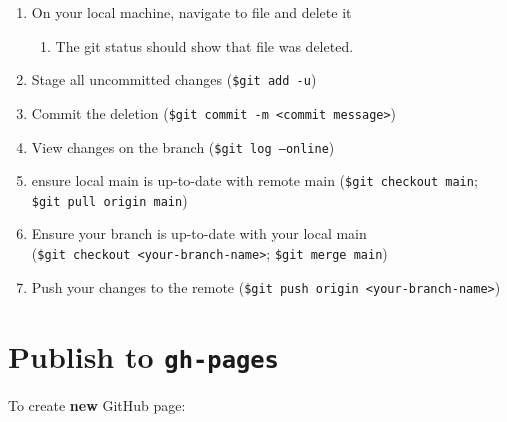 \documentclass[
  letterpaper,
  DIV=11,
  numbers=noendperiod]{scrreprt}
\providecommand{\tightlist}{%
  \setlength{\itemsep}{0pt}\setlength{\parskip}{0pt}}\usepackage{longtable,booktabs,array}
\begin{document}
\begin{enumerate}
\def\labelenumi{\arabic{enumi}.}
\tightlist
\item
  On your local machine, navigate to file and delete it

  \begin{enumerate}
  \def\labelenumii{\alph{enumii}.}
  \tightlist
  \item
    The git status should show that file was deleted.\\
  \end{enumerate}
\item
  Stage all uncommitted changes (\texttt{\$git\ add\ -u})\\
\item
  Commit the deletion
  (\texttt{\$git\ commit\ -m\ \textless{}commit\ message\textgreater{}})\\
\item
  View changes on the branch (\texttt{\$git\ log\ –online})\\
\item
  ensure local main is up-to-date with remote main
  (\texttt{\$git\ checkout\ main}; \texttt{\$git\ pull\ origin\ main})\\
\item
  Ensure your branch is up-to-date with your local main
  (\texttt{\$git\ checkout\ \textless{}your-branch-name\textgreater{}};
  \texttt{\$git\ merge\ main})\\
\item
  Push your changes to the remote
  (\texttt{\$git\ push\ origin\ \textless{}your-branch-name\textgreater{}})
\end{enumerate}

\section{\texorpdfstring{Publish to
\texttt{gh-pages}}{Publish to gh-pages}}\label{publish-to-gh-pages}

To create \textbf{new} GitHub page:
\end{document}
